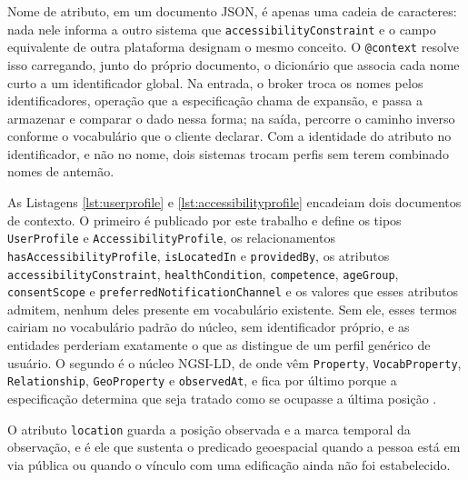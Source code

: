 Nome de atributo, em um documento JSON, é apenas uma cadeia de caracteres: nada nele informa a outro sistema que \texttt{accessibilityConstraint} e o campo equivalente de outra plataforma designam o mesmo conceito. O \texttt{@context} resolve isso carregando, junto do próprio documento, o dicionário que associa cada nome curto a um identificador global. Na entrada, o broker troca os nomes pelos identificadores, operação que a especificação chama de expansão, e passa a armazenar e comparar o dado nessa forma; na saída, percorre o caminho inverso conforme o vocabulário que o cliente declarar. Com a identidade do atributo no identificador, e não no nome, dois sistemas trocam perfis sem terem combinado nomes de antemão.

As Listagens \ref{lst:userprofile} e \ref{lst:accessibilityprofile} encadeiam dois documentos de contexto. O primeiro é publicado por este trabalho e define os tipos \texttt{UserProfile} e \texttt{AccessibilityProfile}, os relacionamentos \texttt{hasAccessibilityProfile}, \texttt{isLocatedIn} e \texttt{providedBy}, os atributos \texttt{accessibilityConstraint}, \texttt{healthCondition}, \texttt{competence}, \texttt{ageGroup}, \texttt{consentScope} e \texttt{preferredNotificationChannel} e os valores que esses atributos admitem, nenhum deles presente em vocabulário existente. Sem ele, esses termos cairiam no vocabulário padrão do núcleo, sem identificador próprio, e as entidades perderiam exatamente o que as distingue de um perfil genérico de usuário. O segundo é o núcleo NGSI-LD, de onde vêm \texttt{Property}, \texttt{VocabProperty}, \texttt{Relationship}, \texttt{GeoProperty} e \texttt{observedAt}, e fica por último porque a especificação determina que seja tratado como se ocupasse a última posição \cite{etsi2024ngsild}.

O atributo \texttt{location} guarda a posição observada e a marca temporal da observação, e é ele que sustenta o predicado geoespacial quando a pessoa está em via pública ou quando o vínculo com uma edificação ainda não foi estabelecido.

